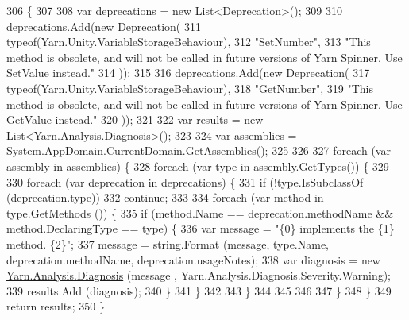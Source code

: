 \begin{DoxyCode}
306         \{
307 
308             var deprecations = \textcolor{keyword}{new} List<Deprecation>();
309 
310             deprecations.Add(\textcolor{keyword}{new} Deprecation(
311                 typeof(Yarn.Unity.VariableStorageBehaviour),
312                 \textcolor{stringliteral}{"SetNumber"},
313                 \textcolor{stringliteral}{"This method is obsolete, and will not be called in future versions of Yarn Spinner. Use
       SetValue instead."}
314             ));
315 
316             deprecations.Add(\textcolor{keyword}{new} Deprecation(
317                 typeof(Yarn.Unity.VariableStorageBehaviour),
318                 \textcolor{stringliteral}{"GetNumber"},
319                 \textcolor{stringliteral}{"This method is obsolete, and will not be called in future versions of Yarn Spinner. Use
       GetValue instead."}
320             ));
321 
322             var results = \textcolor{keyword}{new} List<\hyperlink{a00049}{Yarn.Analysis.Diagnosis}>();
323 
324             var assemblies = System.AppDomain.CurrentDomain.GetAssemblies();
325 
326 
327             \textcolor{keywordflow}{foreach} (var assembly \textcolor{keywordflow}{in} assemblies) \{
328                 \textcolor{keywordflow}{foreach} (var type \textcolor{keywordflow}{in} assembly.GetTypes()) \{
329 
330                     \textcolor{keywordflow}{foreach} (var deprecation \textcolor{keywordflow}{in} deprecations) \{
331                         \textcolor{keywordflow}{if} (!type.IsSubclassOf (deprecation.type))
332                             \textcolor{keywordflow}{continue};
333 
334                         \textcolor{keywordflow}{foreach} (var method \textcolor{keywordflow}{in} type.GetMethods ()) \{
335                             \textcolor{keywordflow}{if} (method.Name == deprecation.methodName && method.DeclaringType == type) \{
336                                 var message = \textcolor{stringliteral}{"\{0\} implements the \{1\} method. \{2\}"};
337                                 message = string.Format (message, type.Name, deprecation.methodName, 
      deprecation.usageNotes);
338                                 var diagnosis = \textcolor{keyword}{new} \hyperlink{a00049}{Yarn.Analysis.Diagnosis} (message
      , Yarn.Analysis.Diagnosis.Severity.Warning);
339                                 results.Add (diagnosis);
340                             \}
341                         \}
342 
343                     \}
344 
345 
346 
347                 \}
348             \}
349             \textcolor{keywordflow}{return} results;
350         \}
\end{DoxyCode}
